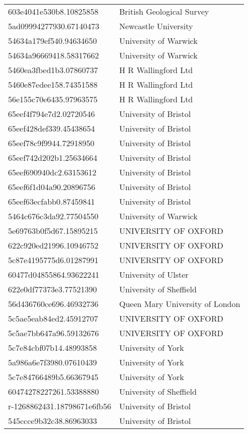 \begin{tabular}{ll}
603e4041e530b8.10825858 & British Geological Survey \\
5ad09994277930.67140473 & Newcastle University \\
54634a179ef540.94634650 & University of Warwick \\
54634a96669418.58317662 & University of Warwick \\
5460ea3fbed1b3.07860737 & H R Wallingford Ltd \\
5460e87edee158.74351588 & H R Wallingford Ltd \\
56e155c70e6435.97963575 & H R Wallingford Ltd \\
65eef4f794e7d2.02720546 & University of Bristol \\
65eef428def339.45438654 & University of Bristol \\
65eef78c9f9944.72918950 & University of Bristol \\
65eef742d202b1.25634664 & University of Bristol \\
65eef690940dc2.63153612 & University of Bristol \\
65eef6f1d04a90.20896756 & University of Bristol \\
65eef63ecfabb0.87459841 & University of Bristol \\
5464c676c3da92.77504550 & University of Warwick \\
5e69763b0f5d67.15895215 & UNIVERSITY OF OXFORD \\
622c920ed21996.10946752 & UNIVERSITY OF OXFORD \\
5c87e4195775d6.01287991 & UNIVERSITY OF OXFORD \\
60477d04855864.93622241 & University of Ulster \\
622e0df77373e3.77521390 & University of Sheffield \\
56d436760ce696.46932736 & Queen Mary University of London \\
5c5ae5eab84ed2.45912707 & UNIVERSITY OF OXFORD \\
5c5ae7bb647a96.59132676 & UNIVERSITY OF OXFORD \\
5c7e84cbf07b14.48993858 & University of York \\
5a986a6e7f3980.07610439 & University of York \\
5c7e84766489b5.66367945 & University of York \\
60474278227261.53388880 & University of Sheffield \\
r-1268862431.18798671e6fb56 & University of Bristol \\
545ccce9b32c38.86963033 & University of Bristol \\

\end{tabular}
